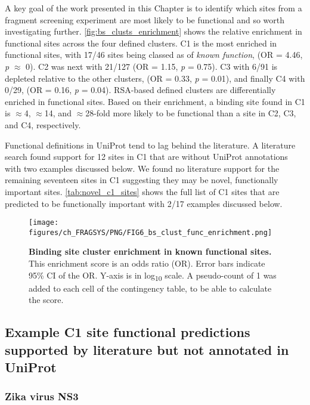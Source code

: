 A key goal of the work presented in this Chapter is to identify which sites from a fragment screening experiment are most likely to be functional and so worth investigating further. \autoref{fig:bs_clusts_enrichment} shows the relative enrichment in functional sites across the four defined clusters. C1 is the most enriched in functional sites, with 17/46 sites being classed as of \textit{known function}, (OR = 4.46, \textit{p} $\approx$ 0). C2 was next with 21/127 (OR = 1.15, \textit{p} = 0.75). C3 with 6/91 is depleted relative to the other clusters, (OR = 0.33, \textit{p} = 0.01), and finally C4 with 0/29, (OR = 0.16, \textit{p} = 0.04). RSA-based defined clusters are differentially enriched in functional sites. Based on their enrichment, a binding site found in C1 is $\approx$4, $\approx$14, and $\approx$28-fold more likely to be functional than a site in C2, C3, and C4, respectively.

Functional definitions in UniProt tend to lag behind the literature. A literature search found support for 12 sites in C1 that are without UniProt annotations with two examples discussed below. We found no literature support for the remaining seventeen sites in C1 suggesting they may be novel, functionally important sites.  \autoref{tab:novel_c1_sites} shows the full list of C1 sites that are predicted to be functionally important with 2/17 examples discussed below.

\begin{figure}[htb!]
    \centering
    \texttt{[image: figures/ch\_FRAGSYS/PNG/FIG6\_bs\_clust\_func\_enrichment.png]}
    \caption[Binding site cluster enrichment in known functional sites]{\textbf{Binding site cluster enrichment in known functional sites.} This enrichment score is an odds ratio (OR). Error bars indicate 95\% CI of the OR. Y-axis is in log\textsubscript{10} scale. A pseudo-count of 1 was added to each cell of the contingency table, to be able to calculate the score.}
    \label{fig:bs_clusts_enrichment}
\end{figure}

\subsection{Example C1 site functional predictions supported by literature but not annotated in UniProt}

\subsubsection{Zika virus NS3}

